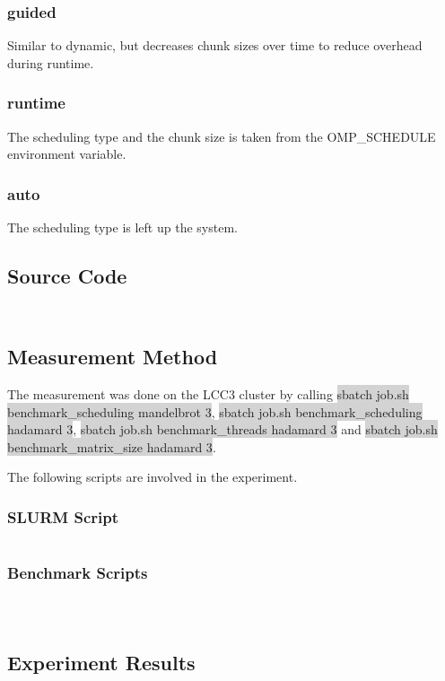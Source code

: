 \documentclass[parskip]{scrartcl}
\begin{document}
	\subsubsection{guided}
	Similar to dynamic, but decreases chunk sizes over time to reduce overhead during runtime.
	\subsubsection{runtime}
	The scheduling type and the chunk size is taken from  the OMP\_SCHEDULE environment variable.
	\subsubsection{auto}
	The scheduling type is left up the system.
	
	\subsection{Source Code}
	\inputminted	[linenos]{c}{ex3/hadamard.c}
	\inputminted	[linenos]{c}{ex3/mandelbrot.c}
	
	\subsection{Measurement Method}
	The measurement was done on the LCC3 cluster by calling \colorbox{lightgray}{sbatch job.sh benchmark\_scheduling mandelbrot 3}, \colorbox{lightgray}{sbatch job.sh benchmark\_scheduling hadamard 3}, \colorbox{lightgray}{sbatch job.sh benchmark\_threads hadamard 3} and \colorbox{lightgray}{sbatch job.sh benchmark\_matrix\_size hadamard 3}.
	
	The following scripts are involved in the experiment.
	\subsubsection{SLURM Script}
	\inputminted[linenos]{bash}{ex3/job.sh}
	\subsubsection{Benchmark Scripts}
	\inputminted[linenos]{bash}{ex3/benchmark_scheduling.sh}
	\inputminted[linenos]{bash}{ex3/benchmark_threads.sh}
	\inputminted[linenos]{bash}{ex3/benchmark_matrix_size.sh}
	
	\subsection{Experiment Results}
\end{document}
